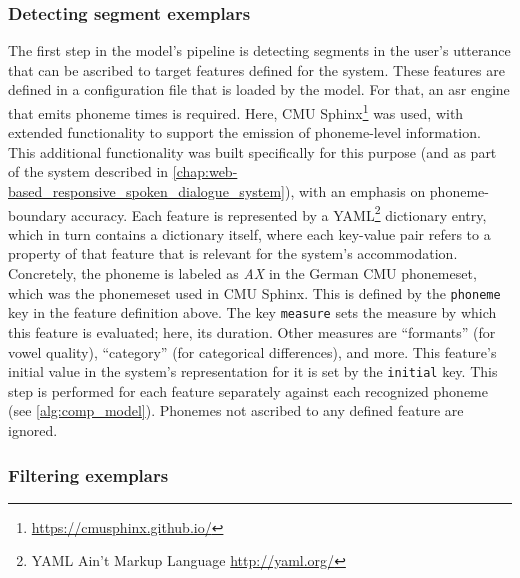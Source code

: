 \subsubsection{Detecting segment exemplars}
\label{subsubsec:detecting segment exemplars}

The first step in the model's pipeline is detecting segments in the user's utterance that can be ascribed to target features defined for the system.
These features are defined in a configuration file that is loaded by the model.
For that, an \ac{asr} engine that emits phoneme times is required.
Here, CMU Sphinx\footnote{\url{https://cmusphinx.github.io/}} was used, with extended functionality to support the emission of phoneme-level information.
This additional functionality was built specifically for this purpose (and as part of the system described in \cref{chap:web-based_responsive_spoken_dialogue_system}), with an emphasis on phoneme-boundary accuracy.
Each feature is represented by a YAML\footnote{YAML Ain't Markup Language \url{http://yaml.org/}} dictionary entry, which in turn contains a dictionary itself, where each key-value pair refers to a property of that feature that is relevant for the system's accommodation.
Concretely, the phoneme \textipa{[@]} is labeled as \textit{AX} in the German CMU phonemeset, which was the phonemeset used in CMU Sphinx.
This is defined by the \texttt{phoneme} key in the feature definition above.
The key \texttt{measure} sets the measure by which this feature is evaluated; here, its duration.
Other measures are \enquote{formants} (for vowel quality), \enquote{category} (for categorical differences), and more.
This feature's initial value in the system's representation for it is set by the \texttt{initial} key.
This step is performed for each feature separately against each recognized phoneme (see \cref{alg:comp_model}).
Phonemes not ascribed to any defined feature are ignored.

\subsubsection{Filtering exemplars}
\label{subsubsec:filtering_exemplars}


